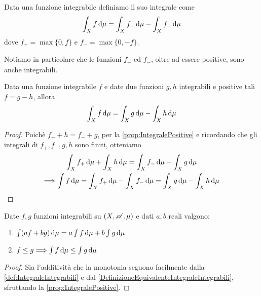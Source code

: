 \begin{definition}\label{def:IntegraleIntegrabili}
	Data una funzione integrabile definiamo il suo integrale come
	\begin{equation*}
		\int_X f\,\mathrm d\mu=\int_Xf_+\,\mathrm d\mu-\int_Xf_-\,\mathrm d\mu
	\end{equation*}
	dove $f_+=\max\{0,f\}$ e $f_-=\max\{0,-f\}$.
\end{definition}

\begin{remark}
	Notiamo in particolare che le funzioni $f_+$ ed $f_-$, oltre ad essere positive, sono anche integrabili.
\end{remark}

\begin{lemma}\label{DefinizioneEquivalenteIntegraleIntegrabili}
	Data una funzione integrabile $f$ e date due funzioni $g,h$ integrabili e positive tali $f=g-h$, allora
	\begin{equation*}
		\int_X f\,\mathrm d\mu=\int_Xg\,\mathrm d\mu-\int_Xh\,\mathrm d\mu
	\end{equation*}
\end{lemma}
\begin{proof}
	Poichè $f_++h=f_-+g$, per la \cref{prop:IntegralePositive} e ricordando che gli integrali di $f_+,f_-,g,h$ sono finiti, otteniamo
	\begin{gather*}
		\int_X f_+\,\mathrm d\mu+\int_X h\,\mathrm d\mu=\int_X f_-\,\mathrm d\mu+\int_X g\,\mathrm d\mu \\
		\Longrightarrow \int f\,\mathrm d\mu=\int_Xf_+\,\mathrm d\mu-\int_Xf_-\,\mathrm d\mu=\int_Xg\,\mathrm d\mu-\int_Xh\,\mathrm d\mu
	\end{gather*}

\end{proof}

\begin{proposition}\label{prop:IntegraleIntegrabili}
	Date $f,g$ funzioni integrabili su $(X,\mathscr A,\mu)$ e dati $a,b$ reali valgono:
	\begin{enumerate}
		\item $\int (af+bg)\,\mathrm d\mu=a\int f\,\mathrm d\mu+b\int g\,\mathrm d\mu$ \label{PII:add}
		\item $f\le g\Longrightarrow \int f\,\mathrm d\mu\le \int g\,\mathrm d\mu$ \label{PII:mono}
	\end{enumerate}
\end{proposition}
\begin{proof}
	Sia l'additività che la monotonia seguono facilmente dalla \cref{def:IntegraleIntegrabili} e dal \cref{DefinizioneEquivalenteIntegraleIntegrabili}, sfruttando la \cref{prop:IntegralePositive}.
\end{proof}




